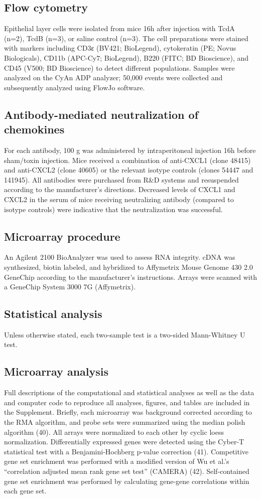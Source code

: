 \subsection{ Flow cytometry }
Epithelial layer cells were isolated from mice 16h after injection with TcdA (n=2), TcdB (n=3), or saline control (n=3). The cell preparations were stained with markers including CD3ε (BV421; BioLegend), cytokeratin (PE; Novus Biologicals), CD11b (APC-Cy7; BioLegend), B220 (FITC; BD Bioscience), and CD45 (V500; BD Bioscience) to detect different populations.  Samples were analyzed on the CyAn ADP analyzer; 50,000 events were collected and subsequently analyzed using FlowJo software.  

\subsection{Antibody-mediated neutralization of chemokines}
For each antibody, 100 \textmu{}g was administered by intraperitoneal injection 16h before sham/toxin injection. Mice received a combination of anti-CXCL1 (clone 48415) and anti-CXCL2 (clone 40605) or the relevant isotype controls (clones 54447 and 141945). All antibodies were purchased from R\&{}D systems and resuspended according to the manufacturer’s directions. Decreased levels of CXCL1 and CXCL2 in the serum of mice receiving neutralizing antibody (compared to isotype controls) were indicative that the neutralization was successful.

\subsection{ Microarray procedure }
An Agilent 2100 BioAnalyzer was used to assess RNA integrity. cDNA was synthesized, biotin labeled, and hybridized to Affymetrix Mouse Genome 430 2.0 GeneChip according to the manufacturer’s instructions. Arrays were scanned with a GeneChip System 3000 7G (Affymetrix).

\subsection{ Statistical analysis }
Unless otherwise stated, each two-sample test is a two-sided Mann-Whitney U test.

\subsection{ Microarray analysis }
Full descriptions of the computational and statistical analyses as well as the data and computer code to reproduce all analyses, figures, and tables are included in the Supplement. Briefly, each microarray was background corrected according to the RMA algorithm, and probe sets were summarized using the median polish algorithm (40). All arrays were normalized to each other by cyclic loess normalization. Differentially expressed genes were detected using the Cyber-T statistical test with a Benjamini-Hochberg p-value correction (41). Competitive gene set enrichment was performed with a modified version of Wu et al.’s “correlation adjusted mean rank gene set test” (CAMERA) (42). Self-contained gene set enrichment was performed by calculating gene-gene correlations within each gene set.

